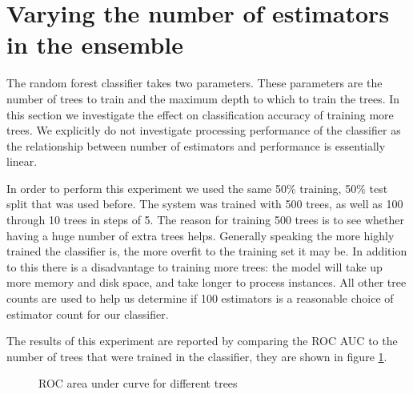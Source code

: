 \documentclass[ %
                    author={Sam Phippen},
                supervisor={Dr. Rafal Bogacz},
                     title={Real time voice activity detectors in noisy personal computing environments},
                  subtitle={},
                    degree={MEng},
                      year={2012} ]{thesis}
\begin{document}
\section{Varying the number of estimators in the ensemble}

The random forest classifier takes two parameters. These parameters are the
number of trees to train and the maximum depth to which to train the trees. In this
section we investigate the effect on classification accuracy of training more
trees. We explicitly do not investigate processing performance of the
classifier as the relationship between number of estimators and performance is
essentially linear.

In order to perform this experiment we used the same 50\% training, 50\% test
split that was used before. The system was trained with 500 trees, as well as
100 through 10 trees in steps of 5. The reason for training 500 trees is to see
whether having a huge number of extra trees helps. Generally speaking the more
highly trained the classifier is, the more overfit to the training set it may
be. In addition to this there is a disadvantage to training more trees: the
model will take up more memory and disk space, and take longer to process
instances. All other tree counts are used to help us determine if 100
estimators is a reasonable choice of estimator count for our classifier.


The results of this experiment are reported by comparing the ROC AUC to the
number of trees that were trained in the classifier, they are shown in
figure \ref{fig:roc-trees}.

\begin{figure}
    \caption{ROC area under curve for different trees}
    \label{fig:roc-trees}
\end{figure}
\end{document}
